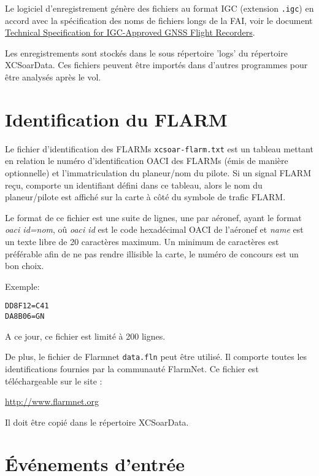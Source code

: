Le logiciel d'enregistrement génère des fichiers au format IGC  (extension \verb|.igc|) en accord avec la spécification des noms de fichiers longs de la FAI, voir le document  {\href{http://www.fai.org/component/phocadownload/category/855-technicalspecifications?download=5745:igc-flight-recorder-specification-edition-2-with-al1-2011-5-31}{Technical Specification for IGC-Approved GNSS Flight Recorders}}.
 
Les enregistrements sont stockés dans le sous répertoire 'logs'  du répertoire XCSoarData. Ces fichiers peuvent être importés dans d'autres programmes pour être analysés après le vol.


\section{Identification du FLARM}\label{sec:flarm-ident-file}

Le fichier d'identification des FLARMs \verb|xcsoar-flarm.txt| est un tableau mettant en relation le numéro d'identification OACI des FLARMs (émis de manière optionnelle) et l'immatriculation du planeur/nom du pilote. Si un signal FLARM reçu, comporte un identifiant défini dans ce tableau, alors le nom du planeur/pilote est affiché sur la carte à côté du symbole de trafic FLARM.

Le format de ce fichier est une suite de lignes, une par aéronef, ayant le format  {\em oaci id=nom}, oû {\em oaci id} est le code hexadécimal OACI de l'aéronef et {\em name} est un texte libre de 20 caractères maximum. Un minimum de caractères est préférable afin de ne pas rendre illisible la carte, le numéro de concours est un bon choix.


Exemple:
\begin{verbatim}
DD8F12=C41
DA8B06=GN
\end{verbatim}

A ce jour, ce fichier est limité à 200 lignes.

De plus, le fichier de Flarmnet \verb|data.fln| peut être utilisé. Il comporte toutes les identifications fournies par la communauté FlarmNet. Ce fichier est téléchargeable sur le site :

\url{http://www.flarmnet.org}

Il doit être copié dans le répertoire XCSoarData.

\section{Événements d'entrée}

